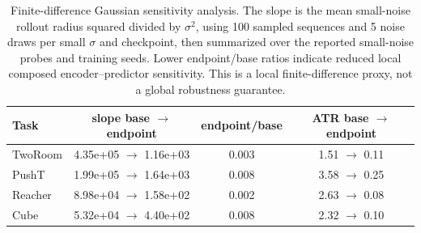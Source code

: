 \begin{table}[H]
\centering
\caption{Finite-difference Gaussian sensitivity analysis. The slope is the mean small-noise rollout radius squared divided by $\sigma^2$, using 100 sampled sequences and 5 noise draws per small $\sigma$ and checkpoint, then summarized over the reported small-noise probes and training seeds. Lower endpoint/base ratios indicate reduced local composed encoder--predictor sensitivity. This is a local finite-difference proxy, not a global robustness guarantee.}
\label{tab:gaussian-sensitivity-audit}
\small
\setlength{\tabcolsep}{4pt}
\begin{tabular}{lccc}
\toprule
Task & slope base $\to$ endpoint & endpoint/base & ATR base $\to$ endpoint \\
\midrule
TwoRoom & 4.35e+05 $\to$ 1.16e+03 & 0.003 & 1.51 $\to$ 0.11 \\
PushT & 1.99e+05 $\to$ 1.64e+03 & 0.008 & 3.58 $\to$ 0.25 \\
Reacher & 8.98e+04 $\to$ 1.58e+02 & 0.002 & 2.63 $\to$ 0.08 \\
Cube & 5.32e+04 $\to$ 4.40e+02 & 0.008 & 2.32 $\to$ 0.10 \\
\bottomrule
\end{tabular}
\end{table}
